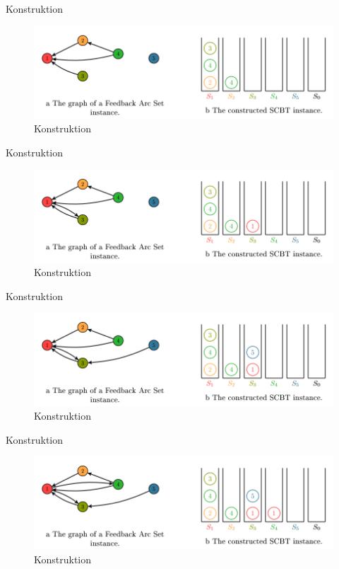 \documentclass{beamer}
\begin{document}
\begin{frame}{Konstruktion}
\begin{figure}[ht]
		\includegraphics[width=\textwidth]{construct05}
		\caption{Konstruktion}
    \end{figure}
\end{frame}

\begin{frame}{Konstruktion}
\begin{figure}[ht]
		\includegraphics[width=\textwidth]{construct06}
		\caption{Konstruktion}
    \end{figure}
\end{frame}

\begin{frame}{Konstruktion}
\begin{figure}[ht]
		\includegraphics[width=\textwidth]{construct07}
		\caption{Konstruktion}
    \end{figure}
\end{frame}

\begin{frame}{Konstruktion}
\begin{figure}[ht]
		\includegraphics[width=\textwidth]{construct08}
		\caption{Konstruktion}
    \end{figure}
\end{frame}
\end{document}
